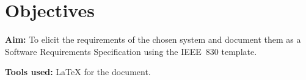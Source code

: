 \section{Objectives}
\textbf{Aim:} To elicit the requirements of the chosen system and document them as a
Software Requirements Specification using the IEEE~830 template.

\textbf{Tools used:} \LaTeX{} for the document.